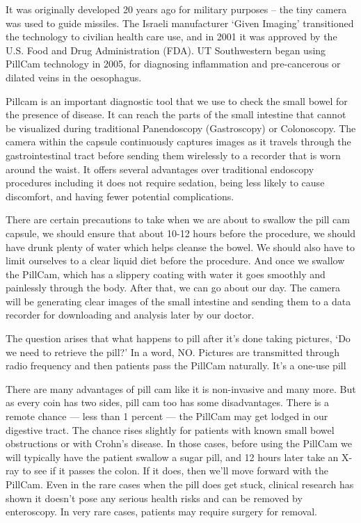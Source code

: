 \documentclass[12pt]{article}
\begin{document}
\indent

It was originally developed 20 years ago for military purposes – the tiny camera was used to guide missiles. The Israeli manufacturer ‘Given Imaging’ transitioned the technology to civilian health care use, and in 2001 it was approved by the U.S. Food and Drug Administration (FDA). UT Southwestern began using PillCam technology in 2005, for diagnosing inflammation and pre-cancerous or dilated veins in the oesophagus. 

\indent

Pillcam is an important diagnostic tool that we use to check the small bowel for the presence of disease. It can reach the parts of the small intestine that cannot be visualized during traditional Panendoscopy (Gastroscopy) or Colonoscopy. The camera within the capsule continuously captures images as it travels through the gastrointestinal tract before sending them wirelessly to a recorder that is worn around the waist. It offers several advantages over traditional endoscopy procedures including it does not require sedation, being less likely to cause discomfort, and having fewer potential complications.

\indent

There are certain precautions to take when we are about to swallow the pill cam capsule, we should ensure that about 10-12 hours before the procedure, we should have drunk plenty of water which helps cleanse the bowel. We should also have to limit ourselves to a clear liquid diet before the procedure. And once we swallow the PillCam, which has a slippery coating with water it goes smoothly and painlessly through the body. After that, we can go about our day. The camera will be generating clear images of the small intestine and sending them to a data recorder for downloading and analysis later by our doctor.

\indent

The question arises that what happens to pill after it's done taking pictures, ‘Do we need to retrieve the pill?’ In a word, NO. Pictures are transmitted through radio frequency and then patients pass the PillCam naturally. It’s a one-use pill

There are many advantages of pill cam like it is non-invasive and many more. But as every coin has two sides, pill cam too has some disadvantages.
There is a remote chance — less than 1 percent — the PillCam may get lodged in our digestive tract. The chance rises slightly for patients with known small bowel obstructions or with Crohn’s disease. In those cases, before using the PillCam we will typically have the patient swallow a sugar pill, and 12 hours later take an X-ray to see if it passes the colon. If it does, then we’ll move forward with the PillCam. Even in the rare cases when the pill does get stuck, clinical research has shown it doesn’t pose any serious health risks and can be removed by enteroscopy. In very rare cases, patients may require surgery for removal.
\end{document}
